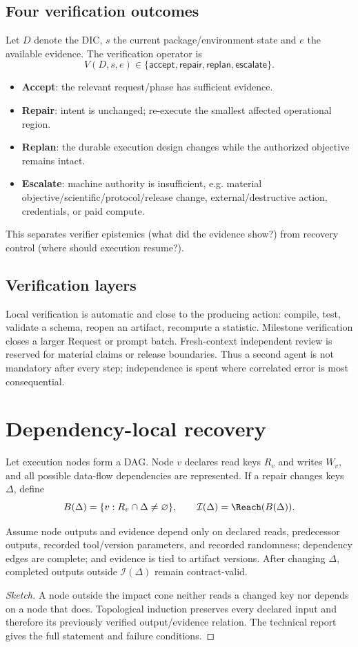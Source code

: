 \documentclass{article}
\begin{document}
\subsection{Four verification outcomes}
Let $D$ denote the DIC, $s$ the current package/environment state and $e$ the available evidence. The verification operator is
\[
V(D,s,e)\in\{\mathsf{accept},\mathsf{repair},\mathsf{replan},\mathsf{escalate}\}.
\]
\begin{itemize}
  \item \textbf{Accept}: the relevant request/phase has sufficient evidence.
  \item \textbf{Repair}: intent is unchanged; re-execute the smallest affected operational region.
  \item \textbf{Replan}: the durable execution design changes while the authorized objective remains intact.
  \item \textbf{Escalate}: machine authority is insufficient, e.g. material objective/scientific/protocol/release change, external/destructive action, credentials, or paid compute.
\end{itemize}
This separates verifier epistemics (what did the evidence show?) from recovery control (where should execution resume?).

\subsection{Verification layers}
Local verification is automatic and close to the producing action: compile, test, validate a schema, reopen an artifact, recompute a statistic. Milestone verification closes a larger Request or prompt batch. Fresh-context independent review is reserved for material claims or release boundaries. Thus a second agent is not mandatory after every step; independence is spent where correlated error is most consequential.

\section{Dependency-local recovery}
Let execution nodes form a DAG. Node $v$ declares read keys $R_v$ and writes $W_v$, and all possible data-flow dependencies are represented. If a repair changes keys $\Delta$, define
\[
B(\Delta)=\{v:R_v\cap\Delta\neq\varnothing\},\qquad
\mathcal I(\Delta)=\Reach(B(\Delta)).
\]

\begin{theorem}
Assume node outputs and evidence depend only on declared reads, predecessor outputs, recorded tool/version parameters, and recorded randomness; dependency edges are complete; and evidence is tied to artifact versions. After changing $\Delta$, completed outputs outside $\mathcal I(\Delta)$ remain contract-valid.
\end{theorem}
\begin{proof}[Sketch]
A node outside the impact cone neither reads a changed key nor depends on a node that does. Topological induction preserves every declared input and therefore its previously verified output/evidence relation. The technical report gives the full statement and failure conditions.
\end{proof}
\end{document}
